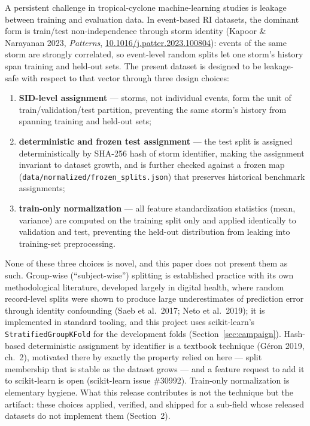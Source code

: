 \documentclass[11pt]{article}
\begin{document}
A persistent challenge in tropical-cyclone machine-learning studies is
leakage between training and evaluation data. In event-based RI datasets,
the dominant form is train/test non-independence through storm identity
(Kapoor \& Narayanan 2023, \emph{Patterns},
\href{https://doi.org/10.1016/j.patter.2023.100804}{10.1016/j.patter.2023.100804}):
events of the same storm are strongly correlated, so event-level random
splits let one storm's history span training and held-out sets. The present
dataset is designed to be leakage-safe with respect to that vector through
three design choices:
\begin{enumerate}
  \item \textbf{SID-level assignment} --- storms, not individual events,
  form the unit of train/validation/test partition, preventing the same
  storm's history from spanning training and held-out sets;
  \item \textbf{deterministic and frozen test assignment} --- the test split
  is assigned deterministically by SHA-256 hash of storm identifier, making
  the assignment invariant to dataset growth, and is further checked against
  a frozen map (\texttt{data/normalized/frozen\_splits.json}) that preserves
  historical benchmark assignments;
  \item \textbf{train-only normalization} --- all feature standardization
  statistics (mean, variance) are computed on the training split only and
  applied identically to validation and test, preventing the held-out
  distribution from leaking into training-set preprocessing.
\end{enumerate}
None of these three choices is novel, and this paper does not present them
as such. Group-wise (``subject-wise'') splitting is established practice with
its own methodological literature, developed largely in digital health, where
random record-level splits were shown to produce large underestimates of
prediction error through identity confounding (Saeb et al.\ 2017; Neto et al.\
2019); it is implemented in standard tooling, and this project uses
scikit-learn's \texttt{StratifiedGroupKFold} for the development folds
(Section~\ref{sec:campaign}). Hash-based deterministic assignment by identifier
is a textbook technique (G\'eron 2019, ch.~2), motivated there by exactly the
property relied on here --- split membership that is stable as the dataset
grows --- and a feature request to add it to scikit-learn is open
(scikit-learn issue \#30992). Train-only normalization is elementary hygiene.
What this release contributes is not the technique but the artifact: these
choices applied, verified, and shipped for a sub-field whose released datasets
do not implement them (Section~2).
\end{document}
